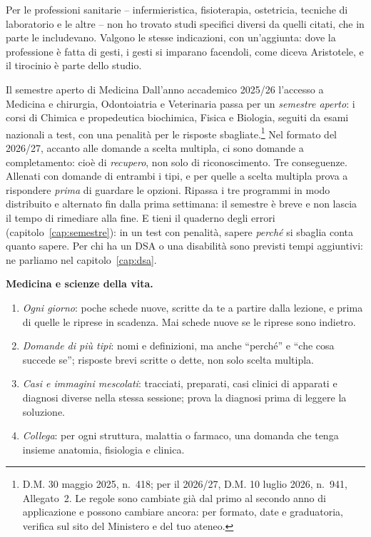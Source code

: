 Per le professioni sanitarie -- infermieristica, fisioterapia,
ostetricia, tecniche di laboratorio e le altre -- non ho trovato studi
specifici diversi da quelli citati, che in parte le includevano. Valgono
le stesse indicazioni, con un'aggiunta: dove la professione è fatta di
gesti, i gesti si imparano facendoli, come diceva Aristotele, e il
tirocinio è parte dello studio.

\begin{riquadro}{Il semestre aperto di Medicina}
Dall'anno accademico 2025/26 l'accesso a Medicina e chirurgia,
Odontoiatria e Veterinaria passa per un \emph{semestre aperto}: i
corsi di Chimica e propedeutica biochimica, Fisica e Biologia, seguiti
da esami nazionali a test, con una penalità per le risposte
sbagliate.\footnote{D.M. 30 maggio 2025, n.~418; per il 2026/27, D.M.
10 luglio 2026, n.~941, Allegato~2. Le regole sono cambiate già dal
primo al secondo anno di applicazione e possono cambiare ancora: per
formato, date e graduatoria, verifica sul sito del Ministero e del tuo
ateneo.} Nel formato del 2026/27, accanto alle domande a scelta
multipla, ci sono domande a completamento: cioè di \emph{recupero}, non
solo di riconoscimento. Tre conseguenze. Allenati con domande di
entrambi i tipi, e per quelle a scelta multipla prova a rispondere
\emph{prima} di guardare le opzioni. Ripassa i tre programmi in modo
distribuito e alternato fin dalla prima settimana: il semestre è breve
e non lascia il tempo di rimediare alla fine. E tieni il quaderno
degli errori (capitolo~\ref{cap:semestre}): in un test con penalità,
sapere \emph{perché} si sbaglia conta quanto sapere. Per chi ha un DSA
o una disabilità sono previsti tempi aggiuntivi: ne parliamo nel
capitolo~\ref{cap:dsa}.
\end{riquadro}

\begin{inpratica}
\textbf{Medicina e scienze della vita.}
\begin{enumerate}
  \item \emph{Ogni giorno}: poche schede nuove, scritte da te a partire
        dalla lezione, e prima di quelle le riprese in scadenza. Mai
        schede nuove se le riprese sono indietro.
  \item \emph{Domande di più tipi}: nomi e definizioni, ma anche
        \enquote{perché} e \enquote{che cosa succede se}; risposte
        brevi scritte o dette, non solo scelta multipla.
  \item \emph{Casi e immagini mescolati}: tracciati, preparati, casi
        clinici di apparati e diagnosi diverse nella stessa sessione;
        prova la diagnosi prima di leggere la soluzione.
  \item \emph{Collega}: per ogni struttura, malattia o farmaco, una
        domanda che tenga insieme anatomia, fisiologia e clinica.
\end{enumerate}
\end{inpratica}

